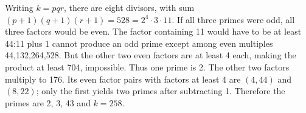 Writing $ k=pqr $, there are eight divisors, with sum $(p+1)(q+1)(r+1)=528=2^4\cdot3\cdot11 $. If all three primes were odd, all three factors would be even. The factor containing 11 would have to be at least 44:11 plus 1 cannot produce an odd prime except among even multiples 44,132,264,528. But the other two even factors are at least 4 each, making the product at least 704, impossible. Thus one prime is 2. The other two factors multiply to 176. Its even factor pairs with factors at least 4 are $(4,44)$ and $(8,22)$; only the first yields two primes after subtracting 1. Therefore the primes are 2, 3, 43 and $\boxed{k=258}$.
